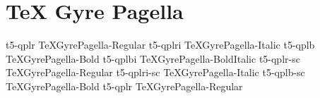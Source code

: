 \documentclass[sample]{vnsample}
\begin{document}
\section{TeX Gyre Pagella}
    {t5-qplr}     {TeXGyrePagella-Regular}
   {t5-qplri}    {TeXGyrePagella-Italic}
    {t5-qplb}     {TeXGyrePagella-Bold}
   {t5-qplbi}    {TeXGyrePagella-BoldItalic}
   {t5-qplr-sc}  {TeXGyrePagella-Regular}
 {t5-qplri-sc} {TeXGyrePagella-Italic}
   {t5-qplb-sc}  {TeXGyrePagella-Bold}
    {t5-qplr}     {TeXGyrePagella-Regular}
\end{document}
